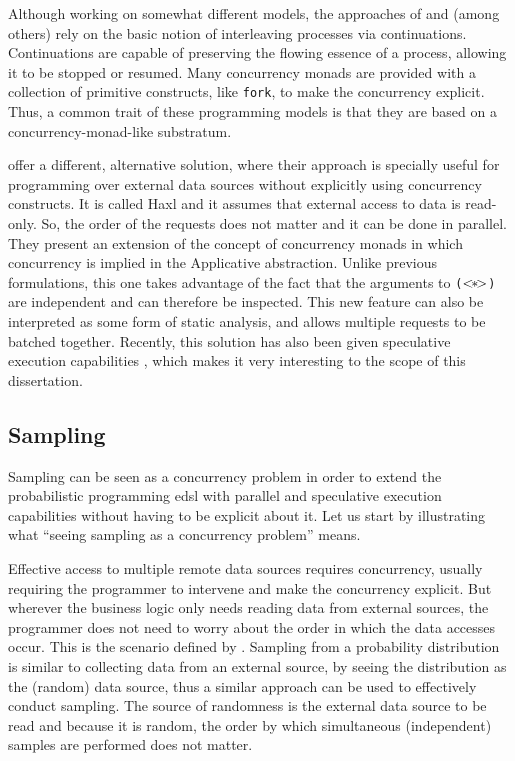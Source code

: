 \documentclass[
  oneside,
  11pt, a4paper,
  footinclude=true,
  headinclude=true,
  cleardoublepage=empty
]{scrbook}
\theoremstyle{definition}
\theoremstyle{definition}
\def\ap{\mathbin{{<\hskip-1ex*\hskip-1ex>}}}
\begin{document}
    Although working on somewhat different models, the approaches of  \cite{Claessen1999FunctionalPA} and \cite{Scholz1995ACM} (among others) rely on the basic notion of interleaving processes via continuations. Continuations are capable of preserving the flowing essence of a process, allowing it to be stopped or resumed. Many concurrency monads are provided with a collection of primitive constructs, like \texttt{fork}, to make the concurrency explicit. Thus, a common trait of these programming models is that they are based on a concurrency-monad-like substratum.
    
    \cite{Marlow:2014:NFA:2692915.2628144} offer a different, alternative solution, where their approach is specially useful for programming over external data sources without explicitly using concurrency constructs. It is called Haxl and it assumes that external access to data is read-only. So, the order of the requests does not matter and it can be done in parallel. They present an extension of the concept of concurrency monads in which concurrency is implied in the Applicative abstraction. Unlike previous formulations, this one takes advantage of the fact that the arguments to \texttt{($\ap$)} are independent and can therefore be inspected. This new feature can also be interpreted as some form of static analysis, and allows multiple requests to be batched together. Recently, this solution has also been given speculative execution capabilities \citep{andrey2019selective}, which makes it very interesting to the scope of this dissertation.
    
    \subsection{Sampling}
    
    Sampling can be seen as a concurrency problem in order to extend the probabilistic programming \gls{edsl} with parallel and speculative execution capabilities without having to be explicit about it. Let us start by illustrating what ``seeing sampling as a concurrency problem'' means.
    
    Effective access to multiple remote data sources requires concurrency, usually requiring the programmer to intervene and make the concurrency explicit. But wherever the business logic only needs reading data from external sources, the programmer does not need to worry about the order in which the data accesses occur. This is the scenario defined by \cite{Marlow:2014:NFA:2692915.2628144}. Sampling from a probability distribution is similar to collecting data from an external source, by seeing the distribution as the (random) data source, thus a similar approach can be used to effectively conduct sampling. The source of randomness is the external data source to be read and because it is random, the order by which simultaneous (independent) samples are performed does not matter.
    
\end{document}
